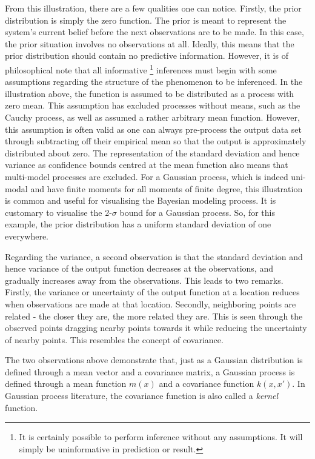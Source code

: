 			From this illustration, there are a few qualities one can notice. Firstly, the prior distribution is simply the zero function. The prior is meant to represent the system's current belief before the next observations are to be made. In this case, the prior situation involves no observations at all. Ideally, this means that the prior distribution should contain no predictive information. However, it is of philosophical note that all informative \footnote{It is certainly possible to perform inference without any assumptions. It will simply be uninformative in prediction or result.} inferences must begin with some assumptions regarding the structure of the phenomenon to be inferenced. In the illustration above, the function is assumed to be distributed as a process with zero mean. This assumption has excluded processes without means, such as the Cauchy process, as well as assumed a rather arbitrary mean function. However, this assumption is often valid as one can always pre-process the output data set through subtracting off their empirical mean so that the output is approximately distributed about zero. The representation of the standard deviation and hence variance as confidence bounds centred at the mean function also means that multi-model processes are excluded. For a Gaussian process, which is indeed uni-modal and have finite moments for all moments of finite degree, this illustration is common and useful for visualising the Bayesian modeling process. It is customary to visualise the 2-$\sigma$ bound for a Gaussian process. So, for this example, the prior distribution has a uniform standard deviation of one everywhere.
			
			Regarding the variance, a second observation is that the standard deviation and hence variance of the output function decreases at the observations, and gradually increases away from the observations. This leads to two remarks. Firstly, the variance or uncertainty of the output function at a location reduces when observations are made at that location. Secondly, neighboring points are related - the closer they are, the more related they are. This is seen through the observed points dragging nearby points towards it while reducing the uncertainty of nearby points. This resembles the concept of covariance. 
			
			The two observations above demonstrate that, just as a Gaussian distribution is defined through a mean vector and a covariance matrix, a Gaussian process is defined through a mean function $m(x)$ and a covariance function $k(x, x')$. In Gaussian process literature, the covariance function is also called a \textit{kernel} function.
			

